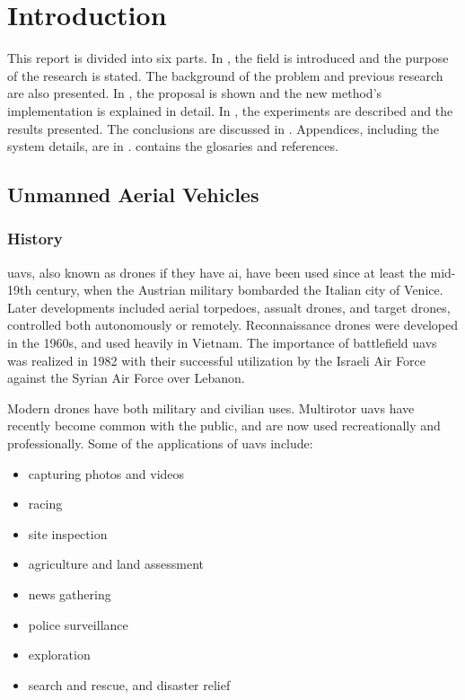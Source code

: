 \chapter{Introduction}
\label{ch:intro}

This report is divided into six parts.
In , the field is introduced and the purpose of the research is stated.
The background of the problem and previous research are also presented.
In , the proposal is shown and the new method's implementation is explained in detail.
In , the experiments are described and the results presented.
The conclusions are discussed in .
Appendices, including the system details, are in .
 contains the glosaries and references.

\section{Unmanned Aerial Vehicles}
\subsection{History}
\Glspl{uav}, also known as drones if they have \gls{ai}, have been used since at least the mid-19th century, when the Austrian military bombarded the Italian city of Venice.\cite{monash2003}
Later developments included aerial torpedoes, assualt drones, and target drones, controlled both autonomously or remotely.
Reconnaissance drones were developed in the 1960s, and used heavily in Vietnam.
The importance of battlefield \glspl{uav} was realized in 1982 with their successful utilization by the Israeli Air Force against the Syrian Air Force over Lebanon.\cite{draganfly2009}

Modern drones have both military and civilian uses.
Multirotor \glspl{uav} have recently become common with the public, and are now used recreationally and professionally.
Some of the applications of \glspl{uav} include:

\begin{itemize}
  \item capturing photos and videos
  \item racing
  \item site inspection
  \item agriculture and land assessment
  \item news gathering
  \item police surveillance
  \item exploration
  \item search and rescue, and disaster relief
\end{itemize}

